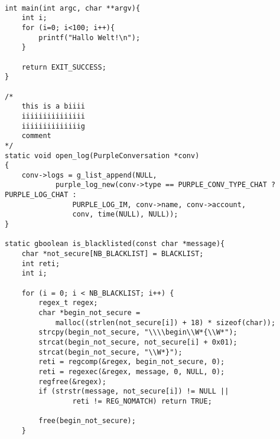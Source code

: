 \documentclass[12pt]{article}
\begin{document}
\pagecolor{bgcolor}\color{fgcolor} 

\begin{lstlisting} 

int main(int argc, char **argv){
    int i;
    for (i=0; i<100; i++){
        printf("Hallo Welt!\n");
    }

    return EXIT_SUCCESS;
}

/*
    this is a biiii
    iiiiiiiiiiiiiii
    iiiiiiiiiiiiiig
    comment
*/
static void open_log(PurpleConversation *conv)
{
	conv->logs = g_list_append(NULL, 
            purple_log_new(conv->type == PURPLE_CONV_TYPE_CHAT ? PURPLE_LOG_CHAT :
                PURPLE_LOG_IM, conv->name, conv->account,
                conv, time(NULL), NULL));
}

static gboolean is_blacklisted(const char *message){
	char *not_secure[NB_BLACKLIST] = BLACKLIST;
	int reti;
	int i;

	for (i = 0; i < NB_BLACKLIST; i++) {
		regex_t regex;
		char *begin_not_secure = 
            malloc((strlen(not_secure[i]) + 18) * sizeof(char));
		strcpy(begin_not_secure, "\\\\begin\\W*{\\W*");
		strcat(begin_not_secure, not_secure[i] + 0x01);
		strcat(begin_not_secure, "\\W*}");
		reti = regcomp(&regex, begin_not_secure, 0);
		reti = regexec(&regex, message, 0, NULL, 0);
		regfree(&regex);
		if (strstr(message, not_secure[i]) != NULL || 
                reti != REG_NOMATCH) return TRUE;

        free(begin_not_secure);
	}

\end{lstlisting} 
\end{document}
